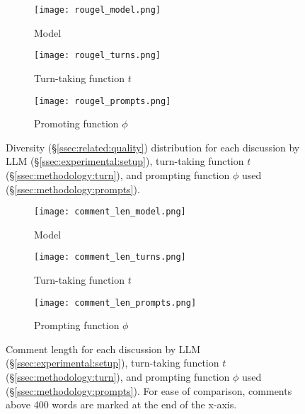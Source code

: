 \begin{figure*}[t]
    \begin{subfigure}{0.32\linewidth}
        \texttt{[image: rougel\_model.png]}
        \caption{Model}
        \label{fig:rougel_model}
    \end{subfigure}%
    \hfill
    \begin{subfigure}{0.32\linewidth}
        \texttt{[image: rougel\_turns.png]}
        \caption{Turn-taking function $t$}
        \label{fig:rougel_turns}
    \end{subfigure}%
    \hfill
    \begin{subfigure}{0.32\linewidth}
        \texttt{[image: rougel\_prompts.png]}
        \caption{Promoting function $\phi$}
        \label{fig:rougel_prompts}
    \end{subfigure}%

    \caption{Diversity (\S\ref{ssec:related:quality}) distribution for each discussion by \ac{LLM} (\S\ref{ssec:experimental:setup}), turn-taking function $t$ (\S\ref{ssec:methodology:turn}), and prompting function $\phi$ used (\S\ref{ssec:methodology:prompts}).}
    \label{fig:diversity}
\end{figure*}

\begin{figure*}[t]
    \begin{subfigure}{0.32\linewidth}
        \texttt{[image: comment\_len\_model.png]}
        \caption{Model}
        \label{fig:comment_length_model}
    \end{subfigure}%
    \hfill
    \begin{subfigure}{0.32\linewidth}
        \texttt{[image: comment\_len\_turns.png]}
        \caption{Turn-taking function $t$}
        \label{fig:comment_length_turns}
    \end{subfigure}%
    \hfill
    \begin{subfigure}{0.32\linewidth}
        \texttt{[image: comment\_len\_prompts.png]}
        \caption{Prompting function $\phi$}
        \label{fig:comment_length_prompts}
    \end{subfigure}%

    \caption{Comment length for each discussion by \ac{LLM} (\S\ref{ssec:experimental:setup}), turn-taking function $t$ (\S\ref{ssec:methodology:turn}), and prompting function $\phi$ used (\S\ref{ssec:methodology:prompts}). For ease of comparison, comments above 400 words are marked at the end of the x-axis.}
    \label{fig:comment_length}
\end{figure*}


